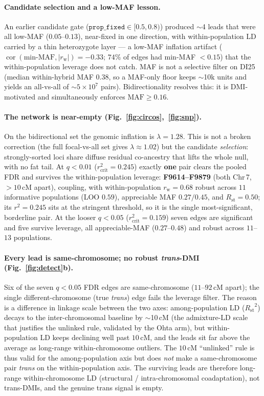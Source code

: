 \documentclass[11pt]{article}
\newcommand{\Rst}{\ensuremath{R_{\mathrm{st}}}}
\newcommand{\wpr}{\ensuremath{r_{\mathrm{w}}}}
\begin{document}
\paragraph{Candidate selection and a low-MAF lesson.}
An earlier candidate gate ($\texttt{prop\_fixed}\in[0.5,0.8)$) produced $\sim$4 leads that were all low-MAF
($0.05$--$0.13$), near-fixed in one direction, with within-population LD carried by a thin heterozygote layer ---
a low-MAF inflation artifact ($\operatorname{cor}(\text{min-MAF},|\wpr|)=-0.33$; $74\%$ of edges had min-MAF $<0.15$)
that the within-population leverage does not catch. MAF is not a selective filter on DI25 (median within-hybrid MAF
$0.38$, so a MAF-only floor keeps $\sim$10k units and yields an all-vs-all of $\sim$$5\times10^7$ pairs). Bidirectionality
resolves this: it is DMI-motivated and simultaneously enforces $\mathrm{MAF}\ge0.16$.

\paragraph{The network is near-empty (Fig.~\ref{fig:circos},~\ref{fig:snp}).}
On the bidirectional set the genomic inflation is $\lambda=1.28$. This is not a broken correction (the full focal-vs-all
set gives $\lambda\approx1.02$) but the candidate \emph{selection}: strongly-sorted loci share diffuse residual
co-ancestry that lifts the whole null, with no fat tail. At $q<0.01$ ($r^2_{\mathrm{crit}}=0.245$) exactly \textbf{one}
pair clears the pooled FDR and survives the within-population leverage: \textbf{F9614--F9879} (both Chr\,7, $>10$\,cM
apart), coupling, with within-population $\wpr=0.68$ robust across $11$ informative populations (LOO $0.59$), appreciable
MAF $0.27/0.45$, and $\Rst=0.50$; its $r^2=0.245$ sits at the stringent threshold, so it is the single most-significant,
borderline pair. At the looser $q<0.05$ ($r^2_{\mathrm{crit}}=0.159$) seven edges are significant and five survive
leverage, all appreciable-MAF ($0.27$--$0.48$) and robust across $11$--$13$ populations.

\paragraph{Every lead is same-chromosome; no robust \emph{trans}-DMI (Fig.~\ref{fig:detect}b).}
Six of the seven $q<0.05$ FDR edges are same-chromosome ($11$--$92$\,cM apart); the single different-chromosome (true
\emph{trans}) edge fails the leverage filter. The reason is a difference in linkage scale between the two axes:
among-population LD ($\Rst^2$) decays to the inter-chromosomal baseline by $\sim$10\,cM (the admixture-LD scale that
justifies the unlinked rule, validated by the Ohta arm), but within-population LD keeps declining well past $10$\,cM,
and the leads sit far above the average as long-range within-chromosome outliers. The $10$\,cM ``unlinked'' rule is thus
valid for the among-population axis but does \emph{not} make a same-chromosome pair \emph{trans} on the within-population
axis. The surviving leads are therefore long-range within-chromosome LD (structural / intra-chromosomal coadaptation),
not trans-DMIs, and the genuine trans signal is empty.
\end{document}

